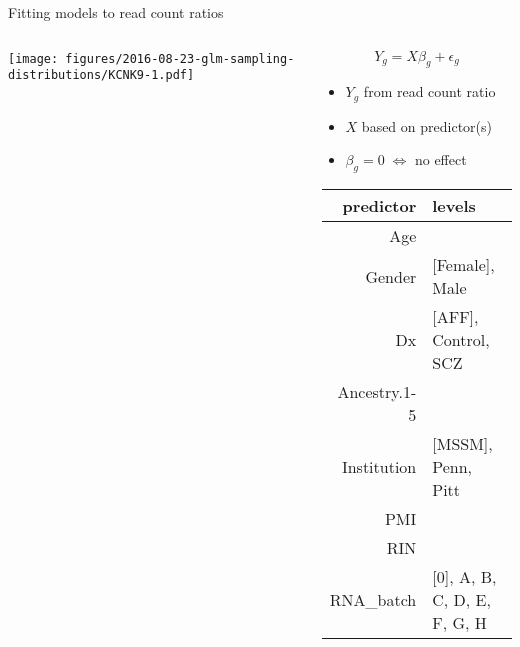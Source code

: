 \documentclass{beamer}
\newcommand{\platefigscale}[0]{0.7}
\begin{document}
\begin{frame}{Fitting models to read count ratios}
\begin{columns}
\begin{column}{0.60\textwidth}

\texttt{[image: figures/2016-08-23-glm-sampling-distributions/KCNK9-1.pdf]}
\end{column}
\begin{column}{0.45\textwidth}
\begin{equation*}
Y_g = X \beta_g + \epsilon_g
\end{equation*}
\vfill
\footnotesize
\begin{itemize}
\item \(Y_g\) from read count ratio
\item \(X\) based on predictor(s)
\item \( \beta_g = 0 \; \Leftrightarrow \) no effect
\end{itemize}
\tiny
\vfill
\begin{tabular}{|r|l|}
\hline
predictor & levels \\
\hline
Age & \\
Gender & [Female], Male\\
Dx & [AFF], Control, SCZ\\
Ancestry.1-5 & \\
Institution & [MSSM], Penn, Pitt\\
PMI & \\
RIN & \\
RNA\_batch & [0], A, B, C, D, E, F, G, H\\
\hline
\end{tabular}


\end{column}
\end{columns}
\end{frame}
\end{document}
